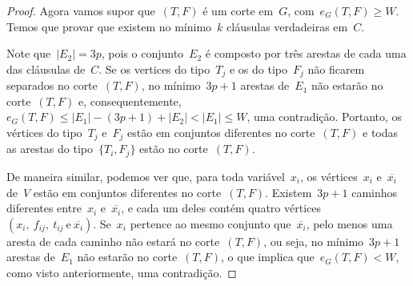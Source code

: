 \begin{proof}



		\bigskip
		\bigskip

		
		Agora vamos supor 
		que~$(T,F)$ é um corte em~$G$,
		com~$e_G(T,F)\ge W$.
		Temos que provar que
		existem no mínimo~$k$ cláusulas verdadeiras em~$C$.

		Note que~${|E_2| = 3}p$, pois o conjunto~$E_2$ é composto por 
		três arestas
		de cada uma das cláusulas de~$C$.  
		Se os vertices do tipo~$T_j$ e os do tipo~$F_j$ não
		ficarem separados no corte~$(T,F)$,
		no mínimo~${3p+1}$ arestas de~$E_1$ não estarão
		no corte~$(T,F)$ e, 
		consequentemente,~${e_G(T,F)\le |E_1|-(3p+1)+|E_2|< |E_1| \le W}$,
		uma contradição. 
		Portanto, os vértices do tipo~$T_j$ e~$F_j$
		estão em conjuntos diferentes no corte~$(T,F)$
		e todas as arestas do tipo~$\{T_i,F_j\}$ estão no
		corte~$(T,F)$.

		De maneira similar, podemos ver que, para toda 
		variável~$x_i$, os vértices~$x_i$ e~$\overline{x_i}$
		de~$V$ estão em conjuntos diferentes no corte~$(T,F)$.
		Existem~$3p+1$ caminhos diferentes entre~$x_i$
		e~$\overline{x_i}$, e cada um deles contém quatro
		vértices~${(x_i,\ f_{ij},\ t_{ij} \ \text{e}\ \overline{x_i})}$.
		Se~$x_i$ pertence ao mesmo conjunto que~$\overline{x_i}$,
		pelo menos uma aresta de cada caminho não estará
		no corte~$(T,F)$, ou seja, no mínimo~$3p+1$ arestas
		de~$E_1$ não estarão no corte~$(T,F)$, o que
		implica que~${e_G(T,F)< W}$, como visto anteriormente,
		uma contradição.


\end{proof}

